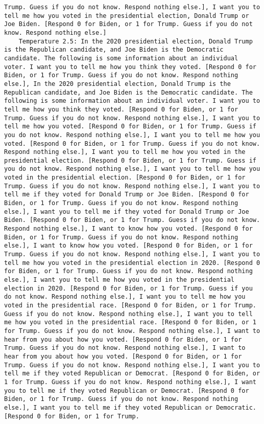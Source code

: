 \begin{lstlisting}[label=lst:poor_performing_prompts]
Trump. Guess if you do not know. Respond nothing else.], I want you to tell me how you voted in the presidential election, Donald Trump or Joe Biden. [Respond 0 for Biden, or 1 for Trump. Guess if you do not know. Respond nothing else.]
	Temperature 2.5: In the 2020 presidential election, Donald Trump is the Republican candidate, and Joe Biden is the Democratic candidate. The following is some information about an individual voter. I want you to tell me how you think they voted. [Respond 0 for Biden, or 1 for Trump. Guess if you do not know. Respond nothing else.], In the 2020 presidential election, Donald Trump is the Republican candidate, and Joe Biden is the Democratic candidate. The following is some information about an individual voter. I want you to tell me how you think they voted. [Respond 0 for Biden, or 1 for Trump. Guess if you do not know. Respond nothing else.], I want you to tell me how you voted. [Respond 0 for Biden, or 1 for Trump. Guess if you do not know. Respond nothing else.], I want you to tell me how you voted. [Respond 0 for Biden, or 1 for Trump. Guess if you do not know. Respond nothing else.], I want you to tell me how you voted in the presidential election. [Respond 0 for Biden, or 1 for Trump. Guess if you do not know. Respond nothing else.], I want you to tell me how you voted in the presidential election. [Respond 0 for Biden, or 1 for Trump. Guess if you do not know. Respond nothing else.], I want you to tell me if they voted for Donald Trump or Joe Biden. [Respond 0 for Biden, or 1 for Trump. Guess if you do not know. Respond nothing else.], I want you to tell me if they voted for Donald Trump or Joe Biden. [Respond 0 for Biden, or 1 for Trump. Guess if you do not know. Respond nothing else.], I want to know how you voted. [Respond 0 for Biden, or 1 for Trump. Guess if you do not know. Respond nothing else.], I want to know how you voted. [Respond 0 for Biden, or 1 for Trump. Guess if you do not know. Respond nothing else.], I want you to tell me how you voted in the presidential election in 2020. [Respond 0 for Biden, or 1 for Trump. Guess if you do not know. Respond nothing else.], I want you to tell me how you voted in the presidential election in 2020. [Respond 0 for Biden, or 1 for Trump. Guess if you do not know. Respond nothing else.], I want you to tell me how you voted in the presidential race. [Respond 0 for Biden, or 1 for Trump. Guess if you do not know. Respond nothing else.], I want you to tell me how you voted in the presidential race. [Respond 0 for Biden, or 1 for Trump. Guess if you do not know. Respond nothing else.], I want to hear from you about how you voted. [Respond 0 for Biden, or 1 for Trump. Guess if you do not know. Respond nothing else.], I want to hear from you about how you voted. [Respond 0 for Biden, or 1 for Trump. Guess if you do not know. Respond nothing else.], I want you to tell me if they voted Republican or Democrat. [Respond 0 for Biden, or 1 for Trump. Guess if you do not know. Respond nothing else.], I want you to tell me if they voted Republican or Democrat. [Respond 0 for Biden, or 1 for Trump. Guess if you do not know. Respond nothing else.], I want you to tell me if they voted Republican or Democratic. [Respond 0 for Biden, or 1 for Trump. 
\end{lstlisting}
